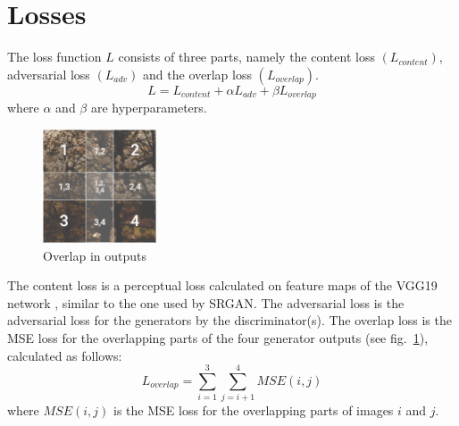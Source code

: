 \documentclass[12pt,a4paper,twocolumn]{article}
\begin{document}
        

    \section{Losses}
        The loss function $L$ consists of three parts, namely the content loss $(L_{content})$, adversarial loss $(L_{adv})$ and the overlap loss $(L_{overlap})$.\\
            $$L = L_{content} + \alpha L_{adv} + \beta L_{overlap}$$
        where $\alpha$ and $\beta$ are hyperparameters.

        \begin{figure}
            \centering
            \includegraphics[width=0.3\textwidth]{images/overlap.png}
            \caption{Overlap in outputs}
            \label{fig:overlap}
        \end{figure}

        The content loss is a perceptual loss \cite{perceptual} calculated on feature maps of the VGG19 network \cite{vgg}, similar to the one used by SRGAN.
        The adversarial loss is the adversarial loss for the generators by the discriminator(s).
        The overlap loss is the MSE loss for the overlapping parts of the four generator outputs (see fig.~\ref{fig:overlap}), calculated as follows:
            $$L_{overlap} = \sum_{i=1}^3 \sum_{j=i+1}^4 MSE(i, j)$$
        where $MSE(i, j)$ is the MSE loss for the overlapping parts of images $i$ and $j$.
        
\end{document}
